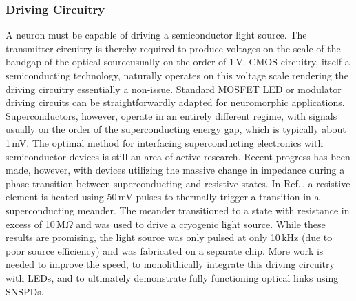 \documentclass[twocolumn]{article}
\begin{document}
\subsubsection{Driving Circuitry}
A neuron must be capable of driving a semiconductor light source. The transmitter circuitry is thereby required to produce voltages on the scale of the bandgap of the optical source\textemdash usually on the order of 1\,V. CMOS circuitry, itself a semiconducting technology, naturally operates on this voltage scale rendering the driving circuitry essentially a non-issue. Standard MOSFET LED or modulator driving circuits \cite{bowers2016recent,LED reference?} can be straightforwardly adapted for neuromorphic applications. Superconductors, however, operate in an entirely different regime, with signals usually on the order of the superconducting energy gap, which is typically about 1\,mV. The optimal method for interfacing superconducting electronics with semiconductor devices is still an area of active research. Recent progress has been made, however, with devices utilizing the massive change in impedance during a phase transition between superconducting and resistive states. In Ref.\,\cite{mccaughan2019superconducting}, a resistive element is heated using 50\,mV pulses to thermally trigger a transition in a superconducting meander. The meander transitioned to a state with resistance in excess of 10\,M$\Omega$ and was used to drive a cryogenic light source. While these results are promising, the light source was only pulsed at only 10\,kHz (due to poor source efficiency) and was fabricated on a separate chip. More work is needed to improve the speed, to monolithically integrate this driving circuitry with LEDs, and to ultimately demonstrate fully functioning optical links using SNSPDs.
\end{document}
